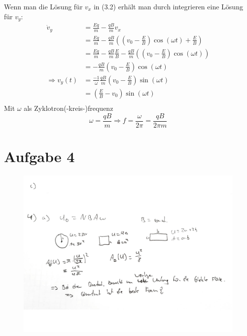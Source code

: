 \documentclass[11pt a4paper]{article}
\begin{document}
\newpage
Wenn man die Lösung für $v_x$ in (3.2) erhält man durch integrieren eine
Lösung für $v_y$:
\begin{align*}
	\dot v_y &= \frac{Eq}{m} - \frac{qB}{m} v_x \\
	&= \frac{Eq}{m} - \frac{qB}{m} \left(
		\left( v_0 - \frac EB \right) \cos(\omega t) + \frac EB
		\right) \\
	&= \frac{Eq}{m} - \frac{qB}{m} \frac EB  - \frac{qB}{m}\left(
		\left( v_0 - \frac EB \right) \cos(\omega t)
		\right) \\
	&= -\frac{qB}{m} \left(v_0 - \frac EB \right)
		\cos (\omega t) \\
	\Rightarrow
	v_y(t)
	&= \frac{-1}{\omega} \frac{qB}{m} \left(v_0 - \frac EB \right)
		\sin (\omega t) \\
	&= \left(\frac EB - v_0 \right)
		\sin (\omega t) \\
\end{align*}
Mit $\omega$ als Zyklotron(-kreis-)frequenz
\[ 
	\omega = \frac{qB}{m} 
	\Rightarrow f = \frac{\omega}{2\pi} = \frac{qB}{2\pi m}
\]

\newpage

\section*{Aufgabe 4}

\begin{figure}[H]
	\centering
	\includegraphics[width=15cm]{4a.jpg}
\end{figure}
\end{document}
